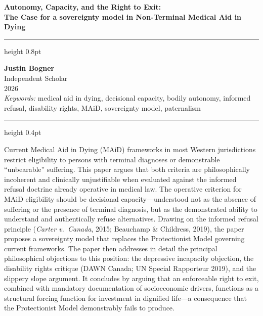\documentclass[11pt, letterpaper]{article}
\begin{document}
\thispagestyle{empty}
\vspace*{0.6cm}

{\raggedright
{\sffamily\LARGE\bfseries\color{C@accent}
Autonomy, Capacity, and the Right to Exit: \\[0.3em]
\large The Case for a sovereignty model in Non-Terminal Medical Aid in Dying}
\par}

\vspace{0.6em}
{\color{C@rulegray}\hrule height 0.8pt}
\vspace{0.5em}

{\sffamily\small\color{C@midgray}
\textbf{Justin Bogner} \\
Independent Scholar \\
2026 \\[0.4em]
\textit{Keywords:} medical aid in dying, decisional capacity, bodily autonomy,
informed refusal, disability rights, MAiD, sovereignty model, paternalism
}

\vspace{0.5em}
{\color{C@rulegray}\hrule height 0.4pt}
\vspace{1.2em}

\begin{policybox}[title={\sffamily\bfseries\small\color{C@accent} Abstract}]
Current Medical Aid in Dying (MAiD) frameworks in most Western jurisdictions restrict
eligibility to persons with terminal diagnoses or demonstrable ``unbearable'' suffering.
This paper argues that both criteria are philosophically incoherent and clinically
unjustifiable when evaluated against the informed refusal doctrine already operative in
medical law. The operative criterion for MAiD eligibility should be decisional
capacity---understood not as the absence of suffering or the presence of terminal
diagnosis, but as the demonstrated ability to understand and authentically refuse
alternatives. Drawing on the informed refusal principle (\textit{Carter v.\ Canada},
2015; Beauchamp \& Childress, 2019), the paper proposes a sovereignty model that
replaces the Protectionist Model governing current frameworks. The paper then addresses
in detail the principal philosophical objections to this position: the depressive
incapacity objection, the disability rights critique (DAWN Canada; UN Special Rapporteur
2019), and the slippery slope argument. It concludes by arguing that an enforceable
right to exit, combined with mandatory documentation of socioeconomic drivers, functions
as a structural forcing function for investment in dignified life---a consequence that
the Protectionist Model demonstrably fails to produce.
\end{policybox}
\end{document}
